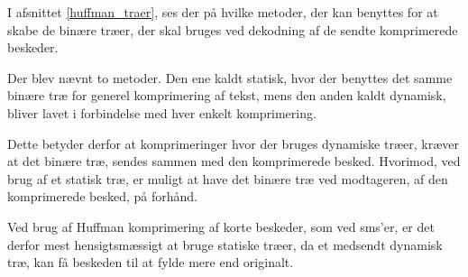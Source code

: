 I afsnittet \ref{huffman_traer}, ses der på hvilke metoder, der kan benyttes for at skabe de binære træer, der skal bruges ved dekodning af de sendte komprimerede beskeder.

Der blev nævnt to metoder. Den ene kaldt statisk, hvor der benyttes det samme binære træ for generel komprimering af tekst, mens den anden kaldt dynamisk, bliver lavet i forbindelse med hver enkelt komprimering.

Dette betyder derfor at komprimeringer hvor der bruges dynamiske træer, kræver at det binære træ, sendes sammen med den komprimerede besked. Hvorimod, ved brug af et statisk træ, er muligt at have det binære træ ved modtageren, af den komprimerede besked, på forhånd.

Ved brug af Huffman komprimering af korte beskeder, som ved sms’er, er det derfor mest hensigtsmæssigt at bruge statiske træer, da et medsendt dynamisk træ, kan få beskeden til at fylde mere end originalt.

